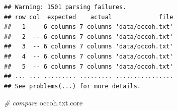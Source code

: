 \documentclass[
]{book}
\newenvironment{Shaded}{\begin{snugshade}}{\end{snugshade}}
\newcommand{\CommentTok}[1]{\textcolor[rgb]{0.56,0.35,0.01}{\textit{#1}}}
\newcommand{\NormalTok}[1]{#1}
\begin{document}
\begin{verbatim}
## Warning: 1501 parsing failures.
## row col  expected    actual             file
##   1  -- 6 columns 7 columns 'data/occoh.txt'
##   2  -- 6 columns 7 columns 'data/occoh.txt'
##   3  -- 6 columns 7 columns 'data/occoh.txt'
##   4  -- 6 columns 7 columns 'data/occoh.txt'
##   5  -- 6 columns 7 columns 'data/occoh.txt'
## ... ... ......... ......... ................
## See problems(...) for more details.
\end{verbatim}

\begin{Shaded}
\begin{Highlighting}[]
\CommentTok{\# compare}
\NormalTok{occoh.txt.core}
\end{Highlighting}
\end{Shaded}
\end{document}
